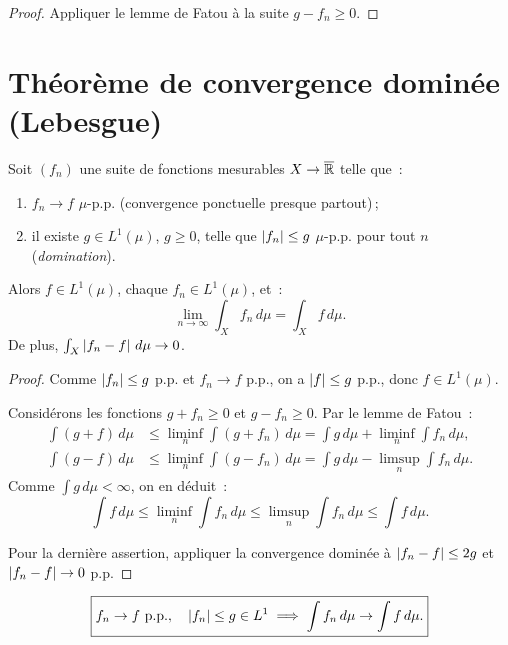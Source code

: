 \begin{proof}
Appliquer le lemme de Fatou \`a la suite $g - f_n \geq 0$.
\end{proof}

\section{Th\'eor\`eme de convergence domin\'ee (Lebesgue)}

\begin{theoreme}
\label{thm:convergence_dominee}
Soit $(f_n)$ une suite de fonctions mesurables $X \to \overline{\mathbb{R}}$ telle que~:
\begin{enumerate}
    \item[(i)] $f_n \to f$ $\mu$-p.p. (convergence ponctuelle presque partout)\,;
    \item[(ii)] il existe $g \in L^1(\mu)$, $g \geq 0$, telle que
    $\left| f_n \right| \leq g$ $\mu$-p.p. pour tout $n$ (\emph{domination}).
\end{enumerate}
Alors $f \in L^1(\mu)$, chaque $f_n \in L^1(\mu)$, et~:
\[
\lim_{n \to \infty} \int_X f_n\, d\mu = \int_X f\, d\mu.
\]
De plus, $\int_X \left| f_n - f \right|\, d\mu \to 0$.
\end{theoreme}

\begin{proof}
Comme $\left| f_n \right| \leq g$ p.p. et $f_n \to f$ p.p., on a $\left| f \right| \leq g$ p.p.,
donc $f \in L^1(\mu)$.

Consid\'erons les fonctions $g + f_n \geq 0$ et $g - f_n \geq 0$. Par le lemme
de Fatou~:
\begin{align*}
\int (g + f)\, d\mu &\leq \liminf_n \int (g + f_n)\, d\mu
= \int g\, d\mu + \liminf_n \int f_n\, d\mu, \\
\int (g - f)\, d\mu &\leq \liminf_n \int (g - f_n)\, d\mu
= \int g\, d\mu - \limsup_n \int f_n\, d\mu.
\end{align*}
Comme $\int g\, d\mu < \infty$, on en d\'eduit~:
\[
\int f\, d\mu \leq \liminf_n \int f_n\, d\mu \leq
\limsup_n \int f_n\, d\mu \leq \int f\, d\mu.
\]

Pour la derni\`ere assertion, appliquer la convergence domin\'ee \`a
$\left| f_n - f \right| \leq 2g$ et $\left| f_n - f \right| \to 0$ p.p.
\end{proof}

\begin{formules}[title=\textbf{Th\'eor\`eme de convergence domin\'ee}]
\[
\boxed{f_n \to f \text{ p.p.}, \quad \left| f_n \right| \leq g \in L^1
\implies \int f_n\, d\mu \to \int f\, d\mu.}
\]
\end{formules}


